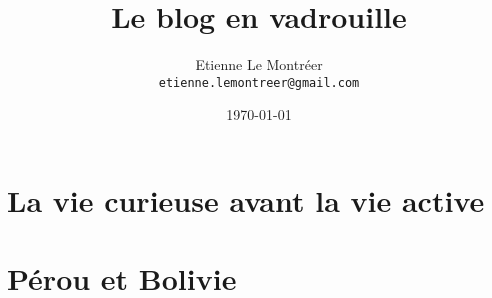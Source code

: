 



\frontmatter
\title{Le blog en vadrouille}
\author{Etienne Le Montr\'eer\\
  \texttt{etienne.lemontreer@gmail.com}}
\date{\today}

\maketitle

\tableofcontents

\mainmatter


%
\pagebreak
\pagebreak
\pagebreak
\pagebreak
\pagebreak
\pagebreak
\pagebreak
\pagebreak
\pagebreak
\pagebreak
\pagebreak

\chapter{La vie curieuse avant la vie active}

\pagebreak
\pagebreak
\pagebreak
\pagebreak
\pagebreak
\pagebreak
\pagebreak
\pagebreak
\pagebreak
\pagebreak
\pagebreak
\pagebreak
\pagebreak
\pagebreak
\pagebreak
\pagebreak
\pagebreak
\pagebreak

\chapter{Pérou et Bolivie}

\pagebreak
\pagebreak
\pagebreak
\pagebreak

